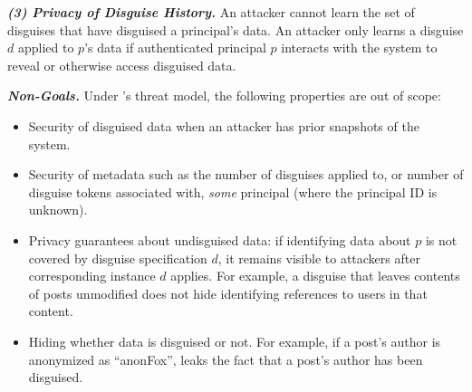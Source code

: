 \vspace{6pt}\noindent\textbf{\emph{(3) Privacy of Disguise History.}}
%
An attacker cannot learn the set of disguises that have disguised a principal's data.
%
An attacker only learns a disguise $d$ applied to $p$'s data if authenticated principal $p$
interacts with the system to reveal or otherwise access disguised data.

\vspace{6pt}\noindent\textbf{\emph{Non-Goals.}}
%
Under \sys's threat model, the following properties are out of scope:
%
\begin{itemize}
    \item Security of disguised data when an attacker has prior snapshots of the system.
    \item Security of metadata such as the number of disguises applied to, or number of
        disguise tokens associated with, \emph{some} principal (where the principal
        ID is unknown).
    \item Privacy guarantees about undisguised data: if identifying data about $p$ is not covered by
        disguise specification $d$, it remains visible to attackers after corresponding instance $d$ applies.
        For example, a disguise that leaves contents of posts unmodified does not hide identifying references
	to users in that content.
    \item Hiding whether data is disguised or not. For example, if a post's author is anonymized as ``anonFox'',
        \sys leaks the fact that a post's author has been disguised.
\end{itemize}

